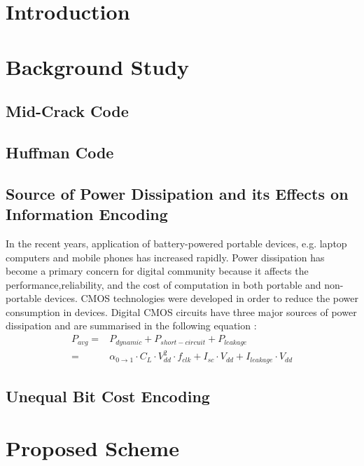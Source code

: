 \documentclass[preprint]{elsarticle} %
\begin{document}
\linenumbers

\section{Introduction}
  



\section{Background Study}
\label{sec2}
\subsection{Mid-Crack Code}
\subsection{Huffman Code}

\subsection{Source of Power Dissipation and its Effects on Information Encoding}
In the recent years, application of battery-powered portable devices, e.g. laptop computers and mobile phones has increased rapidly. Power dissipation has become a primary concern for digital community because it affects the performance,reliability, and the cost of computation         in both portable and non-portable devices. CMOS technologies were developed in order to reduce the power consumption in devices. Digital CMOS circuits have three major sources of power dissipation and are summarised in the following equation \cite{Weste88}:
\begin{equation}
\begin{split}
    P_{avg} ={}& P_{dynamic}+P_{short-circuit}+P_{leakage}\\
         ={}& \alpha_{0 \rightarrow 1}\cdot C_L\cdot V_{dd}^2\cdot f_{clk} + I_{sc}\cdot V_{dd}+I_{leakage}\cdot V_{dd}
\end{split}
\end{equation}


\subsection{Unequal Bit Cost Encoding}


   
\section{Proposed Scheme}
\label{sec3}
\end{document}
